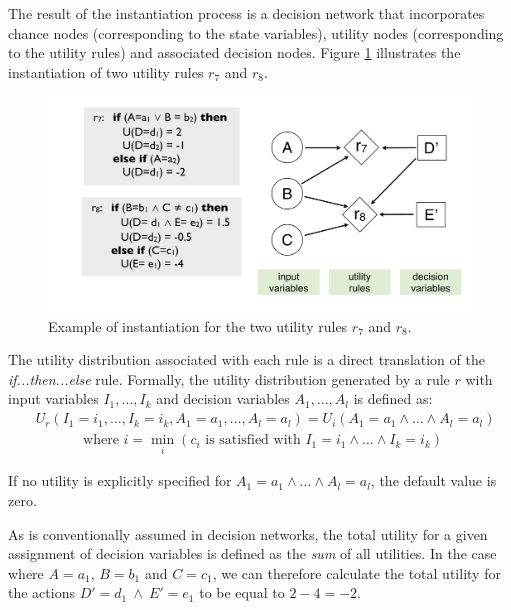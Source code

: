 The result of the instantiation process is a decision network that incorporates chance nodes (corresponding to the state variables), utility nodes (corresponding to the utility rules) and associated decision nodes. Figure \ref{fig:instantitionutil} illustrates the instantiation of two utility rules $r_7$ and $r_8$. 

\begin{figure}[h]
\centering
\includegraphics[scale=0.25]{imgs/ruleinstantiation2.pdf}
\caption{Example of instantiation for the two utility rules $r_7$ and $r_8$.}
\label{fig:instantitionutil}
\end{figure}

The utility distribution associated with each rule is a direct translation of the  \textit{if...then...else} rule.  Formally, the utility distribution generated by a rule $r$ with input variables $I_1, \dots, I_k$ and decision variables $A_1, \dots, A_l$ is defined as:
\begin{align}
& U_r(I_1\!=\!i_1, \dots, I_k\!=\!i_k, A_1\!=\!a_1, \dots, A_l\!=\!a_l) = U_i(A_1\!=\!a_1 \land \dots \land A_l\!=\!a_l) \label{eq:utildistrib}\\
&  \; \; \; \; \; \; \; \;  \; \; \; \text{ where } i = \min_i (c_i \text{ is satisfied with } I_1\!=\!i_1 \land \dots \land I_k\!=\!i_k) \nonumber
\end{align}

If no utility is explicitly specified for $A_1\!=\!a_1 \land \dots \land A_l\!=\!a_l$, the default value is zero. 

As is conventionally assumed in decision networks, the total utility for a given assignment of decision variables is defined as the \textit{sum} of all utilities.  In the case where $A\!=\!a_1$, $B\!=\!b_1$ and $C\!=\!c_1$, we can therefore calculate the total utility for the actions $D'\!=\!d_1 \ \land \ E'\!=\!e_1$ to be equal to $2 - 4 = -2$. 


